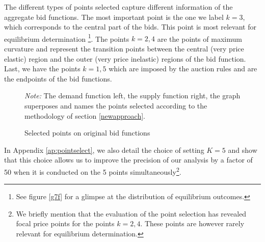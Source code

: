 The different types of points selected capture different information of the aggregate bid functions. The most important point is the one we label $k=3$, which corresponds to the central part of the bids. This point is most relevant for equilibrium determination \footnote{See figure \ref{g7f} for a glimpse at the distribution of equilibrium outcomes.}. The points $k=2,4$ are the points of maximum curvature and represent the transition points between the central (very price elastic) region and the outer (very price inelastic) regions of the bid function. Last, we have the points $k=1,5$ which are imposed by the auction rules and are the endpoints of the bid functions. 

\begin{figure}[!ht]
\begin{center} 
\end{center}
\caption{Selected points on original bid functions}
\emph{Note: } The demand function left, the supply function right, the graph superposes and names the points selected according to the methodology of section \ref{newapproach}.
\label{TypeallocK}
\end{figure}
 
In Appendix \ref{ap:pointselect}, we also detail the choice of setting $K=5$ and show that this choice allows us to improve the precision of our analysis by a factor of 50 when it is conducted on the 5 points simultaneously\footnote{We briefly mention that the evaluation of the point selection has revealed focal price points for the points $k=2,4$. These points are however rarely relevant for equilibrium determination.}.


